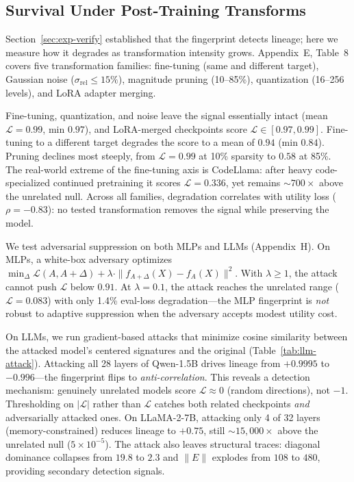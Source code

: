 \documentclass[letterpaper]{article}
\begin{document}
\subsection{Survival Under Post-Training Transforms}\label{sec:survival}

Section~\ref{sec:exp-verify} established that the fingerprint detects lineage; here we measure how it degrades as transformation intensity grows. Appendix~E, Table~8 covers five transformation families: fine-tuning (same and different target), Gaussian noise ($\sigma_{\mathrm{rel}} \le 15\%$), magnitude pruning (10--85\%), quantization (16--256 levels), and LoRA adapter merging.

Fine-tuning, quantization, and noise leave the signal essentially intact (mean $\mathcal{L} = 0.99$, min $0.97$), and LoRA-merged checkpoints score $\mathcal{L} \in [0.97, 0.99]$. Fine-tuning to a different target degrades the score to a mean of $0.94$ (min $0.84$). Pruning declines most steeply, from $\mathcal{L} = 0.99$ at 10\% sparsity to $0.58$ at 85\%. The real-world extreme of the fine-tuning axis is CodeLlama: after heavy code-specialized continued pretraining it scores $\mathcal{L}=0.336$, yet remains ${\sim}700\times$ above the unrelated null. Across all families, degradation correlates with utility loss ($\rho = -0.83$): no tested transformation removes the signal while preserving the model.

We test adversarial suppression on both MLPs and LLMs (Appendix~H). On MLPs, a white-box adversary optimizes $\min_\Delta \mathcal{L}(A,A+\Delta) + \lambda \cdot \|f_{A+\Delta}(X) - f_A(X)\|^2$. With $\lambda \ge 1$, the attack cannot push $\mathcal{L}$ below $0.91$. At $\lambda = 0.1$, the attack reaches the unrelated range ($\mathcal{L} = 0.083$) with only 1.4\% eval-loss degradation---the MLP fingerprint is \emph{not} robust to adaptive suppression when the adversary accepts modest utility cost.

On LLMs, we run gradient-based attacks that minimize cosine similarity between the attacked model's centered signatures and the original (Table~\ref{tab:llm-attack}). Attacking all 28 layers of Qwen-1.5B drives lineage from $+0.9995$ to $\mathbf{-0.996}$---the fingerprint flips to \emph{anti-correlation}. This reveals a detection mechanism: genuinely unrelated models score $\mathcal{L} \approx 0$ (random directions), not $-1$. Thresholding on $|\mathcal{L}|$ rather than $\mathcal{L}$ catches both related checkpoints \emph{and} adversarially attacked ones. On LLaMA-2-7B, attacking only 4 of 32 layers (memory-constrained) reduces lineage to $+0.75$, still ${\sim}15{,}000\times$ above the unrelated null ($5 \times 10^{-5}$). The attack also leaves structural traces: diagonal dominance collapses from $19.8$ to $2.3$ and $\|E\|$ explodes from $108$ to $480$, providing secondary detection signals.
\end{document}
